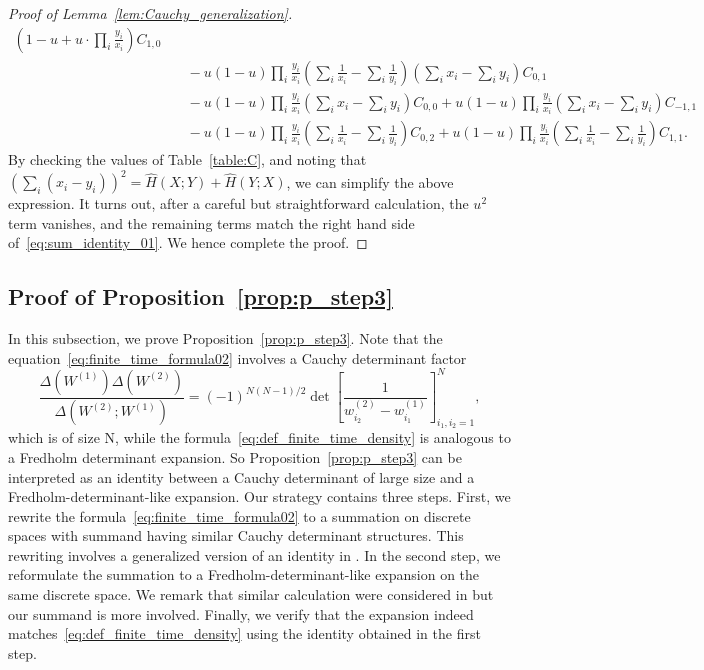 \documentclass{article}
\numberwithin{equation}{section}
\begin{document}
\begin{proof}[Proof of Lemma~\ref{lem:Cauchy_generalization}]
\begin{equation}
\begin{split}
	       \left(1-u+u\cdot\prod_i\frac{y_i}{x_i}\right)
	        C_{1,0}\\
	  &\quad-
		  u(1-u)\prod_i\frac{y_i}{x_i}
		      \left(\sum_i\frac{1}{x_i}-\sum_i\frac{1}{y_i}\right)
		      \left(\sum_ix_i-\sum_iy_i\right) C_{0,1}\\
	  &\quad -
	     u(1-u)\prod_i\frac{y_i}{x_i}
	         \left(\sum_ix_i-\sum_iy_i\right)C_{0,0}
	        +
	     u(1-u)\prod_i\frac{y_i}{x_i}
	         \left(\sum_ix_i-\sum_iy_i\right)C_{-1,1}\\
	  &\quad -
	    u(1-u)\prod_i\frac{y_i}{x_i}
	         \left(\sum_i\frac{1}{x_i}-\sum_i\frac{1}{y_i}\right)C_{0,2}
	         +
	    u(1-u)\prod_i\frac{y_i}{x_i}
	         \left(\sum_i\frac{1}{x_i}-\sum_i\frac{1}{y_i}\right)C_{1,1}.
	\end{split}
\end{equation}
By checking the values of Table~\ref{table:C}, and noting that $\left(\sum_i (x_i-y_i)\right)^2=\hat H(X;Y)+\hat H(Y;X)$, we can simplify the above expression. It turns out, after a careful but straightforward calculation, the $u^2$ term vanishes, and the remaining terms match the right hand side of~\eqref{eq:sum_identity_01}. We hence complete the proof.
\end{proof}

\subsection{Proof of Proposition~\ref{prop:p_step3}}
\label{sec:proof_step3}

In this subsection, we prove Proposition~\ref{prop:p_step3}. Note that the equation~\eqref{eq:finite_time_formula02} involves a Cauchy determinant factor 
\begin{equation*}
	\frac{\Delta\left(W^{(1)}\right) \Delta \left(W^{(2)}\right)}
	     {\Delta\left( W^{(2)}; W^{(1)}\right)}
	      = (-1)^{N(N-1)/2}\det\left[\frac{1}{w_{i_2}^{(2)} -w_{i_1}^{(1)}}\right]_{i_1,i_2=1}^N,
\end{equation*}
which is of size N, while the formula~\eqref{eq:def_finite_time_density} is analogous to a Fredholm determinant expansion. So Proposition~\ref{prop:p_step3} can be interpreted as an identity between a Cauchy determinant of large size and a Fredholm-determinant-like expansion. Our strategy contains three steps. First, we rewrite the formula~\eqref{eq:finite_time_formula02} to a summation on discrete spaces with summand having similar Cauchy determinant structures. This rewriting involves a generalized version of an identity in \cite{Liu19}. In the second step, we reformulate the summation to a Fredholm-determinant-like expansion on the same discrete space. We remark that similar calculation were considered in \cite{Baik-Liu16,Baik-Liu17} but our summand is more involved. Finally, we verify that the expansion indeed matches~\eqref{eq:def_finite_time_density} using the identity obtained in the first step.
\end{document}
